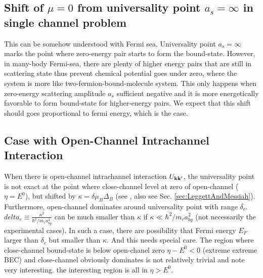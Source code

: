 \subsection{Shift of $\mu=0$ from universality point $a_s=\infty$ in single channel problem}
This can be somehow understood with Fermi sea. Universality point $a_s=\infty$ marks the point where zero-energy pair starts to form the bound-state.  However, in many-body Fermi-sea, there are plenty of higher energy pairs that are still in scattering state thus prevent chemical potential goes under zero, where the system is more like two-fermion-bound-molecule system.  This only happens when zero-energy scattering amplitude $a_s$ sufficient negative and it is more energetically favorable to form bound-state for higher-energy pairs.  We expect that this shift should goes proportional to fermi energy, which is the case.  

\subsection{Case with Open-Channel Intrachannel Interaction}
When there is open-channel intrachannel interaction $U_{\mathbf{k}\mathbf{k}'}$, the universality point is not exact at the point where close-channel level at zero of open-channel ($\eta=E^0$), but shifted by $\kappa=\delta\mu_B\Delta_B$ (see \cite{Leggett}, also see Sec. \ref{sec:LeggettAndMessiah}).  Furthermore, open-channel dominates around universality point with range $\delta_c$.  $delta_c\equiv\frac{\kappa^2}{\hbar^2/m_ra_{bg}^2}$ can be much smaller than $\kappa$ if $\kappa\ll\hbar^2/m_ra_{bg}^2$ (not necessarily the experimental cases).  In such a case, there are possibility that Fermi energy $E_F$ larger than $\delta_c$ but smaller than $\kappa$.  And this needs special care.  The region where close-channel bound-state is below open-chanel zero $\eta-E^0<0$ (extreme extreme BEC) and close-channel obviously dominates is not relatively trivial and note very interesting.  the interesting region is all in $\eta>E^0$.  